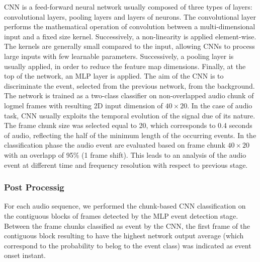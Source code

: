 \documentclass{article}
\begin{document}
\begin{sloppy}
CNN is a feed-forward neural network \cite{Yann-cnn-1998} usually composed of three types of layers: convolutional layers, pooling layers and layers of neurons. The convolutional layer performs the mathematical operation of convolution between a multi-dimensional input and a fixed size kernel. Successively, a non-linearity is applied element-wise. The kernels are generally small compared to the input, allowing CNNs to process large inputs with few learnable parameters. Successively, a pooling layer is usually applied, in order to reduce the feature map dimensions. Finally, at the top of the network, an MLP layer is applied.
The aim of the CNN is to discriminate the event, selected from the previous network, from the background. The network is trained as a two-class classifier on non-overlapped audio chunk of logmel frames with resulting 2D input dimension of $40\times20$. In the case of audio task, CNN usually exploits the temporal evolution of the signal \cite{thomas2014analyzing} due of its nature. 
The frame chunk size was selected equal to 20, which corresponds to 0.4 seconds of audio, reflecting the half of the minimum length of the occurring events.
In the classification phase the audio event are evaluated based on frame chunk $40\times20$ with an overlapp of 95\% (1 frame shift). This leads to an analysis of the audio event at different time and frequency resolution with respect to previous stage. 

\subsubsection{Post Processig }
For each audio sequence, we performed the chunk-based CNN classification on the contiguous blocks of frames detected by the MLP event detection stage. Between the frame chunks classified as event by the CNN, %
the first frame of the contiguous block resulting to have the highest network output average (which correspond to the probability to belog to the event class) was indicated as event onset instant.


\end{sloppy}
\end{document}
